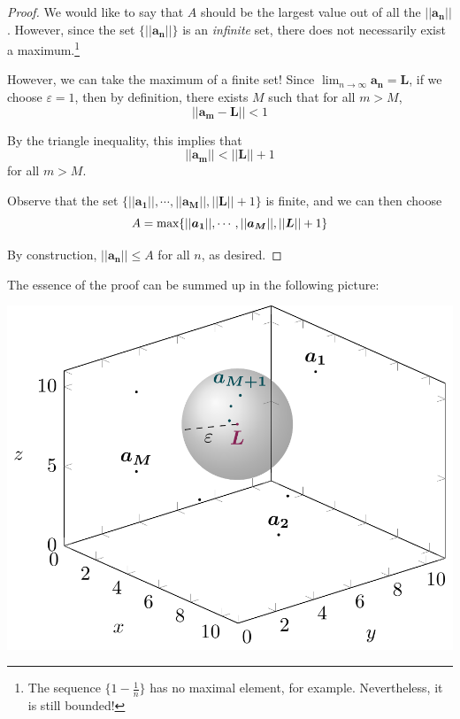     \begin{proof}
    We would like to say that $A$ should be the largest value out of all the $||\bm{a_n}||$.  However, since the set $\{||\bm{a_n}||\}$ is an \textit{infinite} set, there does not necessarily exist a maximum.\footnote{The sequence $\{1-\frac{1}{n}\}$ has no maximal element, for example.  Nevertheless, it is still bounded!}

    However, we can take the maximum of a finite set!  Since $\lim_{n \to \infty}\bm{a_n} = \bm{L}$, if we choose $\varepsilon = 1$, then by definition, there exists $M$ such that for all $m > M$, $$||\bm{a_m} - \bm{L}|| < 1$$

    By the triangle inequality, this implies that $$||\bm{a_m}|| < ||\bm{L}|| + 1$$ for all $m > M$.

    Observe that the set $\{||\bm{a_1}||, \cdots, ||\bm{a_M}||, ||\bm{L}|| + 1 \}$ is finite, and we can then choose
    $$A = \textnormal{max}\{||\bm{a_1}||, \cdots, ||\bm{a_M}||, ||\bm{L}|| + 1 \}$$

    By construction, $||\bm{a_n}|| \leq A$ for all $n$, as desired.
    
    \end{proof}

    The essence of the proof can be summed up in the following picture:

    \begin{center}
        \includegraphics[scale=.5]{chapters/2-RealAnalysis/figures/figures-sequencebounded.pdf}
    \end{center}


